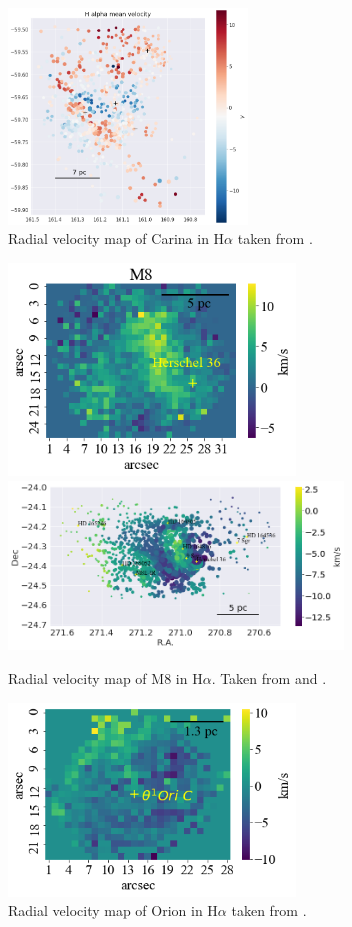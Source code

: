 \documentclass[fleqn,usenatbib, useAMS, a4paper]{mnras}
\begin{document}
\begin{figure}
\centering 
\includegraphics[width=2.5in]{Figures/Car}
\caption{Radial velocity map of Carina in H$\alpha$ taken from \citet{Damiani:2016a}.}
\label{fig:MCar}
\end{figure}

\begin{figure}
\centering 
\includegraphics[width=3in]{Figures/M8H.png}
\includegraphics[width=3.5in]{Figures/M8}
\caption{Radial velocity map of M8 in H$\alpha$. Taken from \citep{Damiani:2017b} and \citet{1987A&A...176..338H}.}
\label{fig:MM8}
\end{figure}

\begin{figure}
\centering 
\includegraphics[width=3in]{Figures/OrionL}
\caption{Radial velocity map of Orion in H$\alpha$ taken from \citet{1987A&A...176..347H}.}
\label{fig:MOrion}
\end{figure}
\end{document}
